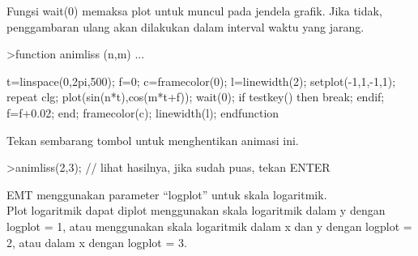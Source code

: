 \documentclass[a4paper,10pt]{article}
\begin{document}
\begin{eulernotebook}
\begin{eulercomment}
\begin{eulercomment}
\begin{eulercomment}
\begin{eulercomment}
\begin{eulercomment}
\begin{eulercomment}
\begin{eulercomment}
\begin{eulercomment}
\begin{eulercomment}
\begin{eulercomment}
\begin{eulercomment}
Fungsi wait(0) memaksa plot untuk muncul pada jendela grafik. Jika
tidak, penggambaran ulang akan dilakukan dalam interval waktu yang
jarang.
\end{eulercomment}
\begin{eulerprompt}
>function animliss (n,m) ...
\end{eulerprompt}
\begin{eulerudf}
  t=linspace(0,2pi,500);
  f=0;
  c=framecolor(0);
  l=linewidth(2);
  setplot(-1,1,-1,1);
  repeat
    clg;
    plot(sin(n*t),cos(m*t+f));
    wait(0);
    if testkey() then break; endif;
    f=f+0.02;
  end;
  framecolor(c);
  linewidth(l);
  endfunction
\end{eulerudf}
\begin{eulercomment}
Tekan sembarang tombol untuk menghentikan animasi ini.
\end{eulercomment}
\begin{eulerprompt}
>animliss(2,3); // lihat hasilnya, jika sudah puas, tekan ENTER
\end{eulerprompt}
\begin{eulercomment}
EMT menggunakan parameter “logplot” untuk skala logaritmik.\\
Plot logaritmik dapat diplot menggunakan skala logaritmik dalam y
dengan logplot = 1, atau menggunakan skala logaritmik dalam x dan y
dengan logplot = 2, atau dalam x dengan logplot = 3.


\end{eulercomment}
\end{eulercomment}
\end{eulercomment}
\end{eulercomment}
\end{eulercomment}
\end{eulercomment}
\end{eulercomment}
\end{eulercomment}
\end{eulercomment}
\end{eulercomment}
\end{eulercomment}
\end{eulernotebook}
\end{document}
